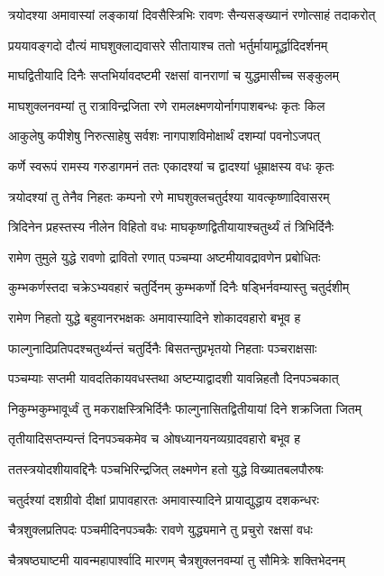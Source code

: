 \twolineshloka
{त्रयोदश्या अमावास्यां लङ्कायां दिवसैस्त्रिभिः}
{रावणः सैन्यसङ्ख्यानं रणोत्साहं तदाकरोत्}%

\twolineshloka
{प्रययावङ्गदो दौत्यं माघशुक्लाद्यवासरे}
{सीतायाश्च ततो भर्तुर्मायामूर्द्धादिदर्शनम्}%

\twolineshloka
{माघद्वितीयादि दिनैः सप्तभिर्यावदष्टमी}
{रक्षसां वानराणां च युद्धमासीच्च सङ्कुलम्}%

\twolineshloka
{माघशुक्लनवम्यां तु रात्राविन्द्रजिता रणे}
{रामलक्ष्मणयोर्नागपाशबन्धः कृतः किल}%

\twolineshloka
{आकुलेषु कपीशेषु निरुत्साहेषु सर्वशः}
{नागपाशविमोक्षार्थं दशम्यां पवनोऽजपत्}%

\twolineshloka
{कर्णे स्वरूपं रामस्य गरुडागमनं ततः}
{एकादश्यां च द्वादश्यां धूम्राक्षस्य वधः कृतः}%

\twolineshloka
{त्रयोदश्यां तु तेनैव निहतः कम्पनो रणे}
{माघशुक्लचतुर्दश्या यावत्कृष्णादिवासरम्}%

\twolineshloka
{त्रिदिनेन प्रहस्तस्य नीलेन विहितो वधः}
{माघकृष्णद्वितीयायाश्चतुर्थ्यं तं त्रिभिर्दिनैः}%

\twolineshloka
{रामेण तुमुले युद्धे रावणो द्रावितो रणात्}
{पञ्चम्या अष्टमीयावद्रावणेन प्रबोधितः}%

\twolineshloka
{कुम्भकर्णस्तदा चक्रेऽभ्यवहारं चतुर्दिनम्}
{कुम्भकर्णो दिनैः षड्भिर्नवम्यास्तु चतुर्दशीम्}%

\twolineshloka
{रामेण निहतो युद्धे बहुवानरभक्षकः}
{अमावास्यादिने शोकादवहारो बभूव ह}%

\twolineshloka
{फाल्गुनादिप्रतिपदश्चतुर्थ्यन्तं चतुर्दिनैः}
{बिसतन्तुप्रभृतयो निहताः पञ्चराक्षसाः}%

\twolineshloka
{पञ्चम्याः सप्तमी यावदतिकायवधस्तथा}
{अष्टम्याद्वादशी यावन्निहतौ दिनपञ्चकात्}%

\twolineshloka
{निकुम्भकुम्भावूर्ध्वं तु मकराक्षस्त्रिभिर्दिनैः}
{फाल्गुनासितद्वितीयायां दिने शक्रजिता जितम्}%

\twolineshloka
{तृतीयादिसप्तम्यन्तं दिनपञ्चकमेव च}
{ओषध्यानयनव्यग्रादवहारो बभूव ह}%

\twolineshloka
{ततस्त्रयोदशीयावद्दिनैः पञ्चभिरिन्द्रजित्}
{लक्ष्मणेन हतो युद्धे विख्यातबलपौरुषः}%

\twolineshloka
{चतुर्दश्यां दशग्रीवो दीक्षां प्रापावहारतः}
{अमावास्यादिने प्रायाद्युद्धाय दशकन्धरः}%

\twolineshloka
{चैत्रशुक्लप्रतिपदः पञ्चमीदिनपञ्चकैः}
{रावणे युद्ध्यमाने तु प्रचुरो रक्षसां वधः}%

\twolineshloka
{चैत्रषष्ठ्याष्टमी यावन्महापार्श्वादि मारणम्}
{चैत्रशुक्लनवम्यां तु सौमित्रेः शक्तिभेदनम्}%

